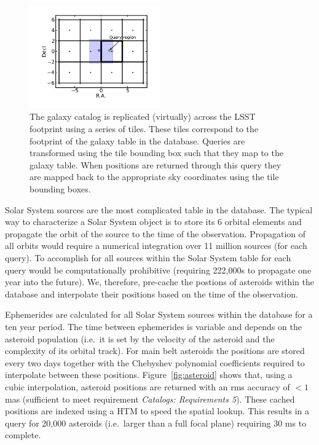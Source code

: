 \documentclass[11pt]{article}
\begin{document}
\begin{figure}[h]
\centering
\includegraphics[width=0.5\textwidth]{validation_figures/basicDemo.png}
\caption{The galaxy catalog is replicated (virtually) across the LSST
  footprint using a series of tiles. These tiles correspond to the
  footprint of the galaxy table in the database. Queries are
  transformed using the tile bounding box such that they map to the
  galaxy table. When positions are returned through this query they
  are mapped back to the appropriate sky coordinates using the tile
  bounding boxes.}
\label{fig:galcoverage}
\end{figure}

Solar System sources are the most complicated table in the
database. The typical way to characterize a Solar System object is to
store its 6 orbital elements and propagate the orbit of the source to
the time of the observation. Propagation of all orbits would require a
numerical integration over 11 million sources (for each query). To
accomplish for all sources within the Solar System table for each
query would be computationally prohibitive (requiring 222,000s to
propagate one year into the future). We, therefore, pre-cache the
postions of asteroids within the database and interpolate their
positions based on the time of the observation.

Ephemerides are calculated for all Solar System sources within the
database for a ten year period. The time between ephemerides is
variable and depends on the asteroid population (i.e.\ it is set by
the velocity of the asteroid and the complexity of its orbital
track). For main belt asteroids the positions are stored every two
days together with the Chebyshev polynomial coefficients required to
interpolate between these positions. Figure~\ref{fig:asteroid} shows that,
using a cubic interpolation, asteroid positions are returned with an
rms accuracy of $<1$ mas (sufficient to meet requirement {\it
  Catalogs: Requirements 5}). These cached positions are indexed using
a HTM to speed the spatial lookup. This results in a query for 20,000
asteroids (i.e.\ larger than a full focal plane) requiring 30 ms to
complete.
\end{document}
